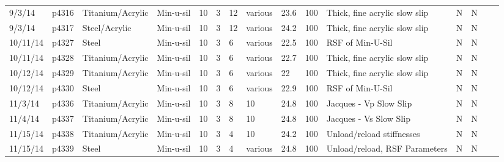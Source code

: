 \begin{landscape}
\begin{longtable}{lllllllllllllll}
9/3/14   & p4316      & Titanium/Acrylic & Min-u-sil    & 10           & 3         & 12            & various                      & 23.6        & 100      & Thick, fine acrylic slow slip                   & N     & N    &  &  \\
9/3/14   & p4317      & Steel/Acrylic    & Min-u-sil    & 10           & 3         & 12            & various                      & 24.2        & 100      & Thick, fine acrylic slow slip                   & N     & N    &  &  \\
10/11/14 & p4327      & Steel            & Min-u-sil    & 10           & 3         & 6             & various                      & 22.5        & 100      & RSF of Min-U-Sil                                & N     & N    &  &  \\
10/11/14 & p4328      & Titanium/Acrylic & Min-u-sil    & 10           & 3         & 6             & various                      & 22.7        & 100      & Thick, fine acrylic slow slip                   & N     & N    &  &  \\
10/12/14 & p4329      & Titanium/Acrylic & Min-u-sil    & 10           & 3         & 6             & various                      & 22          & 100      & Thick, fine acrylic slow slip                   & N     & N    &  &  \\
10/12/14 & p4330      & Steel            & Min-u-sil    & 10           & 3         & 6             & various                      & 22.9        & 100      & RSF of Min-U-Sil                                & N     & N    &  &  \\
11/3/14  & p4336      & Titanium/Acrylic & Min-u-sil    & 10           & 3         & 8             & 10                           & 24.8        & 100      & Jacques - Vp Slow Slip                          & N     & N    &  &  \\
11/4/14  & p4337      & Titanium/Acrylic & Min-u-sil    & 10           & 3         & 8             & 10                           & 24.8        & 100      & Jacques - Vs Slow Slip                          & N     & N    &  &  \\
11/15/14 & p4338      & Titanium/Acrylic & Min-u-sil    & 10           & 3         & 4             & 10                           & 24.2        & 100      & Unload/reload stiffnesses                       & N     & N    &  &  \\
11/15/14 & p4339      & Steel            & Min-u-sil    & 10           & 3         & 4             & various                      & 24.8        & 100      & Unload/reload, RSF Parameters                   & N     & N    &  &  \\

\end{longtable}
\end{landscape}
